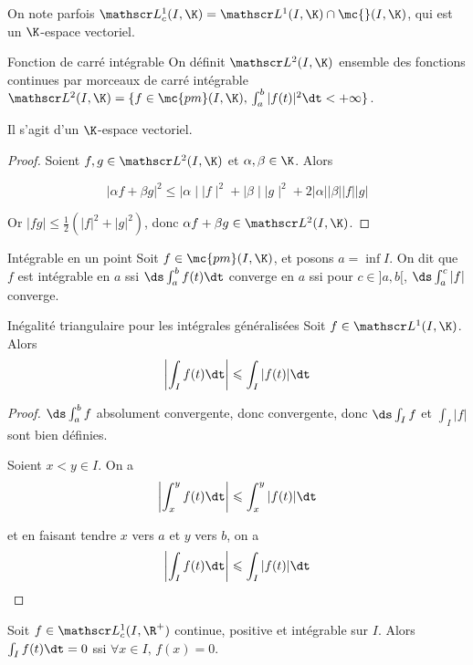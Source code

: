 \begin{remarque}
    On note parfois $\mathscr L^1_c(I, \K) = \mathscr L^1(I, \K) \cap \mc {} (I, \K)$, 
    qui est un $\K$-espace vectoriel.
\end{remarque}

\begin{definition}{Fonction de carré intégrable}{}
    On définit $\mathscr L^2(I, \K)$ ensemble des fonctions continues par morceaux de carré 
    intégrable $\mathscr L^2(I, \K) = \{f \in \mc {pm}(I, \K), \, \int_a^b |f(t)|^2 \dt < + \infty\}$.

    Il s'agit d'un $\K$-espace vectoriel.
\end{definition}

\begin{proof}
    Soient $f, g \in \mathscr L^2(I, \K)$ et $\alpha, \beta \in \K$. Alors

    $$|\alpha f + \beta g|^2 \leqslant \mid \alpha \mid \mid f \mid ^2 + \mid \beta \mid \mid g \mid^2 + 2 |\alpha| |\beta| |f| |g| $$

    Or $|fg| \leqslant \frac 1 2 (|f|^2 + |g|^2)$, donc $\alpha f + \beta g \in \mathscr L^2(I, \K)$.
\end{proof}

\begin{definition}{Intégrable en un point}{}
    Soit $f \in \mc {pm}(I, \K)$, et posons $a = \inf I$. On dit que $f$ est intégrable en 
    $a$ ssi $\ds \int_a^b f(t) \dt$ converge en $a$ ssi pour $c \in ]a, b[$, $\ds \int_a^c |f|$ converge.
\end{definition}

\begin{theoreme}{Inégalité triangulaire pour les intégrales généralisées}{}
    Soit $f \in \mathscr L^1(I, \K)$. Alors 
    $$\left| \int_I f(t) \dt \right| \leqslant \int_I |f(t)| \dt$$
\end{theoreme}

\begin{proof}
    $\ds \int_{a }^{b } f$ absolument convergente, donc convergente, donc 
    $\ds \int_I f$ et $\int_I |f|$ sont bien définies.

    \avspace Soient $x < y \in I$. On a 
    $$\left| \int_x^y f(t) \dt \right| \leqslant \int_x^y |f(t)| \dt$$

    et en faisant tendre $x$ vers $a$ et $y$ vers $b$, on a
    $$\left| \int_I f(t) \dt \right| \leqslant \int_I |f(t)| \dt$$
\end{proof}


\begin{proposition}{}{}
    Soit $f \in \mathscr L^1_c (I, \R^+)$ continue, positive et intégrable sur $I$. 
    Alors $\int_I f(t) \dt =0$ ssi $\forall x \in I, \, f(x) = 0$.
\end{proposition}

